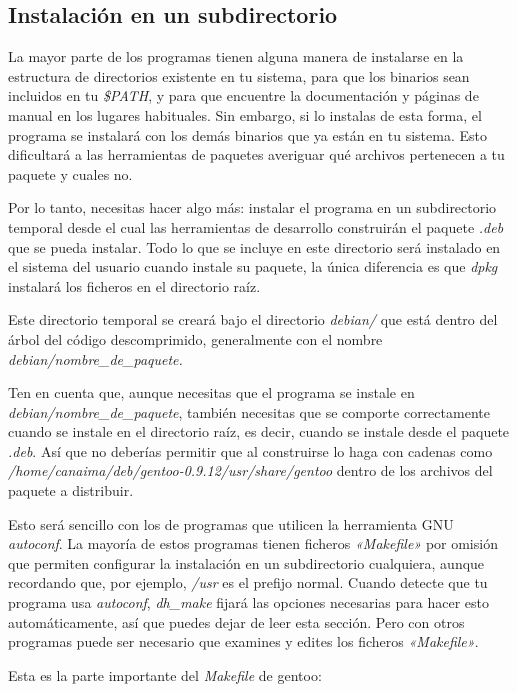 \documentclass[letterpaper,12pt,spanish]{manual}
\begin{document}
\subsection{Instalación en un subdirectorio}

La mayor parte de los programas tienen alguna manera de instalarse en la estructura de directorios existente en tu sistema, para que los binarios sean incluidos en tu \emph{\$PATH}, y para que encuentre la documentación y páginas de manual en los lugares habituales. Sin embargo, si lo instalas de esta forma, el programa se instalará con los demás binarios que ya están en tu sistema. Esto dificultará a las herramientas de paquetes averiguar qué archivos pertenecen a tu paquete y cuales no.

Por lo tanto, necesitas hacer algo más: instalar el programa en un subdirectorio temporal desde el cual las herramientas de desarrollo construirán el paquete \emph{.deb} que se pueda instalar. Todo lo que se incluye en este directorio será instalado en el sistema del usuario cuando instale su paquete, la única diferencia es que \emph{dpkg} instalará los ficheros en el directorio raíz.

Este directorio temporal se creará bajo el directorio \emph{debian/} que está dentro del árbol del código descomprimido, generalmente con el nombre \emph{debian/nombre\_de\_paquete.}

Ten en cuenta que, aunque necesitas que el programa se instale en \emph{debian/nombre\_de\_paquete}, también necesitas que se comporte correctamente cuando se instale en el directorio raíz, es decir, cuando se instale desde el paquete \emph{.deb}. Así que no deberías permitir que al construirse lo haga con cadenas como \emph{/home/canaima/deb/gentoo-0.9.12/usr/share/gentoo} dentro de los archivos del paquete a distribuir.

Esto será sencillo con los de programas que utilicen la herramienta GNU \emph{autoconf}. La mayoría de estos programas tienen ficheros \emph{«Makefile»} por omisión que permiten configurar la instalación en un subdirectorio cualquiera, aunque recordando que, por ejemplo, \emph{/usr} es el prefijo normal. Cuando detecte que tu programa usa \emph{autoconf}, \emph{dh\_make} fijará las opciones necesarias para hacer esto automáticamente, así que puedes dejar de leer esta sección. Pero con otros programas puede ser necesario que examines y edites los ficheros \emph{«Makefile»}.

Esta es la parte importante del \emph{Makefile} de gentoo:
\end{document}
